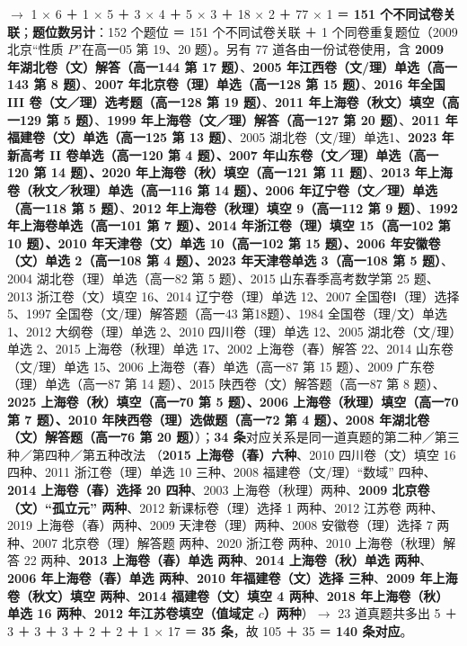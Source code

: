 \documentclass[a4paper,11pt]{article}
\begin{document}
\begin{itemize}
  $\to$ 1 $\times$ 6 ＋ 1 $\times$ 5 ＋ 3 $\times$ 4 ＋ 5 $\times$ 3 ＋ 18 $\times$ 2 ＋ 77 $\times$ 1 ＝ \textbf{151 个不同试卷关联}；\textbf{题位数另计}：152 个题位 ＝ 151 个不同试卷关联 ＋ 1 个同卷重复题位（2009 北京``性质 \(P\)''在高一05 第 19、20 题）。另有 77 道各由一份试卷使用，含 \textbf{2009 年湖北卷（文）解答（高一144 第 17 题）}、\textbf{2005 年江西卷（文/理）单选（高一143 第 8 题）}、\textbf{2007 年北京卷（理）单选（高一128 第 15 题）}、\textbf{2016 年全国 III 卷（文／理）选考题（高一128 第 19 题）}、\textbf{2011 年上海卷（秋文）填空（高一129 第 5 题）}、\textbf{1999 年上海卷（文／理）解答（高一127 第 20 题）}、\textbf{2011 年福建卷（文）单选（高一125 第 13 题）}、2005 湖北卷（文/理）单选1、\textbf{2023 年新高考 II 卷单选（高一120 第 4 题）、2007 年山东卷（文／理）单选（高一120 第 14 题）、2020 年上海卷（秋）填空（高一121 第 11 题）}、\textbf{2013 年上海卷（秋文／秋理）单选（高一116 第 14 题）、2006 年辽宁卷（文／理）单选（高一118 第 5 题）}、\textbf{2012 年上海卷（秋理）填空 9（高一112 第 9 题）}、\textbf{1992 年上海卷单选（高一101 第 7 题）、2014 年浙江卷（理）填空 15（高一102 第 10 题）、2010 年天津卷（文）单选 10（高一102 第 15 题）、2006 年安徽卷（文）单选 2（高一108 第 4 题）、2023 年天津卷单选 3（高一108 第 5 题）}、2004 湖北卷（理）单选（高一82 第 5 题）、2015 山东春季高考数学第 25 题、2013 浙江卷（文）填空 16、2014 辽宁卷（理）单选 12、2007 全国卷Ⅰ（理）选择 5、1997 全国卷（文/理）解答题（高一43 第18题）、1984 全国卷（理/文）单选 1、2012 大纲卷（理）单选 2、2010 四川卷（理）单选 12、2005 湖北卷（文/理）单选 2、2015 上海卷（秋理）单选 17、2002 上海卷（春）解答 22、2014 山东卷（文/理）单选 15、2006 上海卷（春）单选（高一87 第 15 题）、2009 广东卷（理）单选（高一87 第 14 题）、2015 陕西卷（文）解答题（高一87 第 8 题）、\textbf{2025 上海卷（秋）填空（高一70 第 5 题）、2006 上海卷（秋理）填空（高一70 第 7 题）、2010 年陕西卷（理）选做题（高一72 第 4 题）、2008 年湖北卷（文）解答题（高一76 第 20 题）}）；\textbf{34 条}对应关系是同一道真题的第二种／第三种／第四种／第五种改法
  （\textbf{2015 上海卷（春）六种}、2010 四川卷（文）填空 16 四种、2011 浙江卷（理）单选 10 三种、2008 福建卷（文/理）``数域'' 四种、\textbf{2014 上海卷（春）选择 20 四种}、2003 上海卷（秋理）两种、\textbf{2009 北京卷（文）``孤立元'' 两种}、2012 新课标卷（理）选择 1 两种、2012 江苏卷 两种、2019 上海卷（春）两种、2009 天津卷（理）两种、2008 安徽卷（理）选择 7 两种、2007 北京卷（理）解答题 两种、2020 浙江卷 两种、2010 上海卷（秋理）解答 22 两种、\textbf{2013 上海卷（春）单选 两种}、\textbf{2014 上海卷（秋）单选 两种}、\textbf{2006 年上海卷（春）单选 两种}、\textbf{2010 年福建卷（文）选择 三种}、\textbf{2009 年上海卷（秋文）填空 两种}、\textbf{2014 福建卷（文）填空 4 两种}、\textbf{2018 年上海卷（秋）单选 16 两种}、\textbf{2012 年江苏卷填空（值域定 \(c\)）两种}）$\to$ 23 道真题共多出 5 ＋ 3 ＋ 3 ＋ 3 ＋ 2 ＋ 2 ＋ 1 $\times$ 17 ＝ \textbf{35 条}，故 105 ＋ 35 ＝ \textbf{140 条对应}。
\end{itemize}
\end{document}
